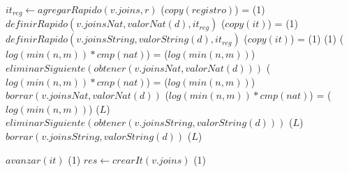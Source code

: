 {                \State
                \State $it_{reg} \gets agregarRapido(v.joins, r)$   \comment \bigo($copy(registro)$) = \bigo(1)
                    \State $definirRapido(v.joinsNat, valorNat(d), it_{reg})$           \comment \bigo($copy(it)$) = \bigo(1)
                \Else
                    \State $definirRapido(v.joinsString, valorString(d), it_{reg})$     \comment \bigo($copy(it)$) = \bigo(1)
                \EndIf
            \EndIf
        \Else
                                                       \comment \bigo(1)
                           \comment \bigo($log(min(n,m)) * cmp(nat)$) = \bigo($log(min(n,m))$)
                    \State $eliminarSiguiente(obtener(v.joinsNat, valorNat(d)))$
                    \Statex                                         \comment \bigo($log(min(n,m)) * cmp(nat)$) = \bigo($log(min(n,m))$)
                    \State $borrar(v.joinsNat, valorNat(d))$        \comment \bigo($log(min(n,m)) * cmp(nat)$) = \bigo($log(min(n,m))$)
                \EndIf
            \Else
                     \comment \bigo($L$)
                    \State $eliminarSiguiente(obtener(v.joinsString, valorString(d)))$  \comment \bigo($L$)
                    \State $borrar(v.joinsString, valorString(d))$  \comment \bigo($L$)
                \EndIf
            \EndIf
        \EndIf

        \State $avanzar(it)$                                        \comment \bigo(1)
    \EndWhile
    \State $res \gets crearIt(v.joins)$                             \comment \bigo(1)
}{}
